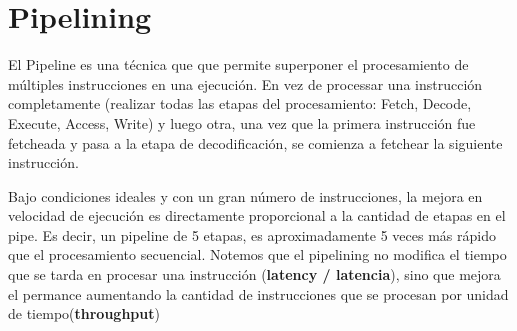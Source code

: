 %
%
%
%
%

\newpage
\section{Pipelining}
El Pipeline es una técnica que que permite superponer el procesamiento de múltiples instrucciones en una ejecución. En vez de processar una instrucción completamente (realizar todas las etapas del procesamiento: Fetch, Decode, Execute, Access, Write) y luego otra,  una vez que la primera instrucción fue fetcheada y pasa a la etapa de decodificación, se comienza a fetchear la siguiente instrucción. 

Bajo condiciones ideales y con un gran número de instrucciones, la mejora en velocidad de ejecución es directamente proporcional a la cantidad de etapas en el pipe. Es decir, un pipeline de 5 etapas, es aproximadamente 5 veces más rápido que el procesamiento secuencial.  Notemos que el pipelining no modifica el tiempo que se tarda en procesar una instrucción (\textbf{latency / latencia}), sino que mejora el permance aumentando la cantidad de instrucciones que se procesan por unidad de tiempo(\textbf{throughput})

